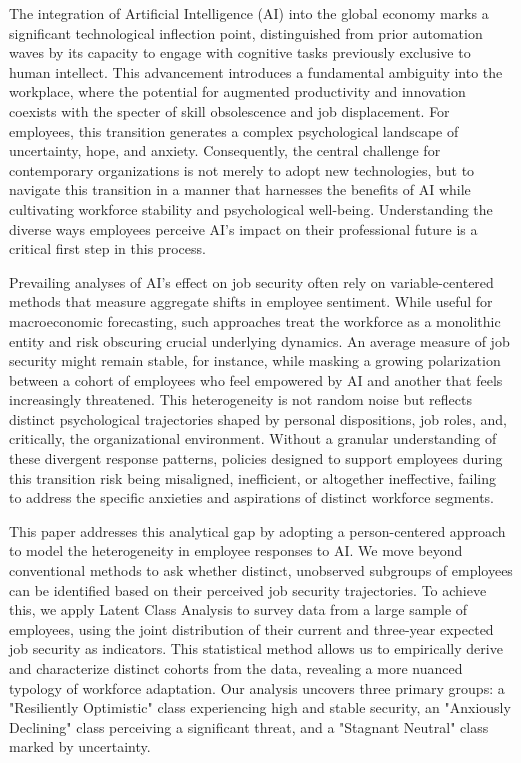 \documentclass[]{article}
\begin{document}
The integration of Artificial Intelligence (AI) into the global economy marks a significant technological inflection point, distinguished from prior automation waves by its capacity to engage with cognitive tasks previously exclusive to human intellect. This advancement introduces a fundamental ambiguity into the workplace, where the potential for augmented productivity and innovation coexists with the specter of skill obsolescence and job displacement. For employees, this transition generates a complex psychological landscape of uncertainty, hope, and anxiety. Consequently, the central challenge for contemporary organizations is not merely to adopt new technologies, but to navigate this transition in a manner that harnesses the benefits of AI while cultivating workforce stability and psychological well-being. Understanding the diverse ways employees perceive AI's impact on their professional future is a critical first step in this process.

Prevailing analyses of AI's effect on job security often rely on variable-centered methods that measure aggregate shifts in employee sentiment. While useful for macroeconomic forecasting, such approaches treat the workforce as a monolithic entity and risk obscuring crucial underlying dynamics. An average measure of job security might remain stable, for instance, while masking a growing polarization between a cohort of employees who feel empowered by AI and another that feels increasingly threatened. This heterogeneity is not random noise but reflects distinct psychological trajectories shaped by personal dispositions, job roles, and, critically, the organizational environment. Without a granular understanding of these divergent response patterns, policies designed to support employees during this transition risk being misaligned, inefficient, or altogether ineffective, failing to address the specific anxieties and aspirations of distinct workforce segments.

This paper addresses this analytical gap by adopting a person-centered approach to model the heterogeneity in employee responses to AI. We move beyond conventional methods to ask whether distinct, unobserved subgroups of employees can be identified based on their perceived job security trajectories. To achieve this, we apply Latent Class Analysis to survey data from a large sample of employees, using the joint distribution of their current and three-year expected job security as indicators. This statistical method allows us to empirically derive and characterize distinct cohorts from the data, revealing a more nuanced typology of workforce adaptation. Our analysis uncovers three primary groups: a "Resiliently Optimistic" class experiencing high and stable security, an "Anxiously Declining" class perceiving a significant threat, and a "Stagnant Neutral" class marked by uncertainty.
\end{document}
